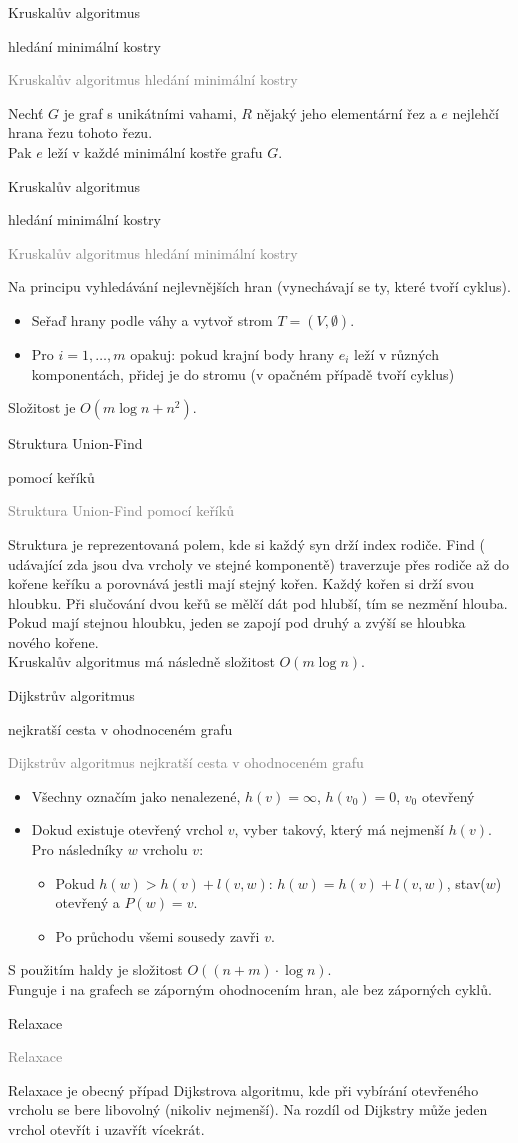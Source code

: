 \documentclass[20pt]{extarticle}
\newcommand{\card}[3][]{
	\vspace*{\fill}

	\newpage
	\topskip0pt
	\vspace*{\fill}
		\Large #2

		\vspace{1cm}
		\normalsize #1
	\vspace*{\fill}
	\newpage

	\small \textcolor{gray}{#2 #1}
	\topskip0pt
	\vspace*{\fill}

	\normalsize
	#3
	\vspace*{\fill}
}
\begin{document}
\begin{center}
\card[hledání minimální kostry]{Kruskalův algoritmus}{
	Nechť $G$ je graf s unikátními vahami, $R$ nějaký jeho elementární řez a $e$ nejlehčí
	hrana řezu tohoto řezu.\\
	Pak $e$ leží v každé minimální kostře grafu $G$.
}

\card[hledání minimální kostry]{Kruskalův algoritmus}{
	\small
	Na principu vyhledávání nejlevnějších hran (vynechávají se ty, které tvoří cyklus).
	\begin{itemize}
		\item Seřaď hrany podle váhy a vytvoř strom $T=(V, \emptyset)$.
		\item Pro $i=1,\dots,m$ opakuj: pokud krajní body hrany $e_i$ leží v různých
		komponentách, přidej je do stromu (v opačném případě tvoří cyklus)
	\end{itemize}
	Složitost je $O(m \log n + n^2)$.
}

\card[pomocí keříků]{Struktura Union-Find}{
	\small
	Struktura je reprezentovaná polem, kde si každý syn drží index rodiče. Find (
	udávající zda jsou dva vrcholy ve stejné komponentě) traverzuje přes rodiče
	až do kořene keříku a porovnává jestli mají stejný kořen. Každý kořen si drží
	svou hloubku. Při slučování dvou keřů se mělčí dát pod hlubší, tím se nezmění hlouba.
	Pokud mají stejnou hloubku, jeden se zapojí pod druhý a zvýší se hloubka nového kořene.\\
	Kruskalův algoritmus má následně složitost $O(m \log n)$.
}

\card[nejkratší cesta v ohodnoceném grafu]{Dijkstrův algoritmus}{
	\footnotesize
	\begin{itemize}
		\item Všechny označím jako nenalezené, $h(v) = \infty$, $h(v_0) = 0$, $v_0$ otevřený
		\item Dokud existuje otevřený vrchol $v$, vyber takový, který má nejmenší $h(v)$.
		Pro následníky $w$ vrcholu $v$:
		\begin{itemize}
			\item Pokud $h(w) > h(v) + l(v, w)$: $h(w) = h(v) + l(v, w)$, stav($w$) otevřený
			a $P(w) = v$.
			\item Po průchodu všemi sousedy zavři $v$.
		\end{itemize}
	\end{itemize}
	S použitím haldy je složitost $O((n+m) \cdot \log n).$\\
	Funguje i na grafech se záporným ohodnocením hran, ale bez záporných cyklů.
}

\card{Relaxace}{
	Relaxace je obecný případ Dijkstrova algoritmu, kde při vybírání otevřeného
	vrcholu se bere libovolný (nikoliv nejmenší). Na rozdíl od Dijkstry může
	jeden vrchol otevřít i uzavřít vícekrát.
}


\end{center}
\end{document}
